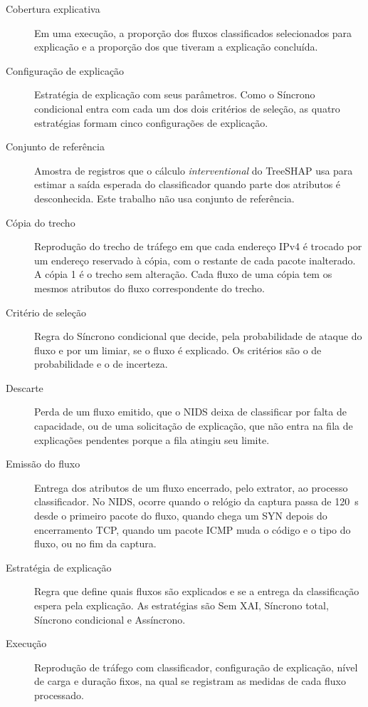 \documentclass[
  12pt,
  oneside,
  a4paper,
  chapter=TITLE,
  sumario=tradicional,
  english,
  brazil
]{abntex2}
\begin{document}
\begin{description}
  \item[Cobertura explicativa]\label{gl:cobertura-explicativa} Em uma execução, a proporção dos fluxos classificados selecionados para explicação e a proporção dos que tiveram a explicação concluída.
  \item[Configuração de explicação]\label{gl:configuracao} Estratégia de explicação com seus parâmetros. Como o Síncrono condicional entra com cada um dos dois critérios de seleção, as quatro estratégias formam cinco configurações de explicação.
  \item[Conjunto de referência]\label{gl:conjunto-referencia} Amostra de registros que o cálculo \emph{interventional} do TreeSHAP usa para estimar a saída esperada do classificador quando parte dos atributos é desconhecida. Este trabalho não usa conjunto de referência.
  \item[Cópia do trecho]\label{gl:copia} Reprodução do trecho de tráfego em que cada endereço IPv4 é trocado por um endereço reservado à cópia, com o restante de cada pacote inalterado. A cópia 1 é o trecho sem alteração. Cada fluxo de uma cópia tem os mesmos atributos do fluxo correspondente do trecho.
  \item[Critério de seleção]\label{gl:criterio-selecao} Regra do Síncrono condicional que decide, pela probabilidade de ataque do fluxo e por um limiar, se o fluxo é explicado. Os critérios são o de probabilidade e o de incerteza.
  \item[Descarte]\label{gl:descarte} Perda de um fluxo emitido, que o NIDS deixa de classificar por falta de capacidade, ou de uma solicitação de explicação, que não entra na fila de explicações pendentes porque a fila atingiu seu limite.
  \item[Emissão do fluxo]\label{gl:emissao} Entrega dos atributos de um fluxo encerrado, pelo extrator, ao processo classificador. No NIDS, ocorre quando o relógio da captura passa de 120~s desde o primeiro pacote do fluxo, quando chega um SYN depois do encerramento TCP, quando um pacote ICMP muda o código e o tipo do fluxo, ou no fim da captura.
  \item[Estratégia de explicação]\label{gl:estrategia} Regra que define quais fluxos são explicados e se a entrega da classificação espera pela explicação. As estratégias são Sem XAI, Síncrono total, Síncrono condicional e Assíncrono.
  \item[Execução]\label{gl:execucao} Reprodução de tráfego com classificador, configuração de explicação, nível de carga e duração fixos, na qual se registram as medidas de cada fluxo processado.

\end{description}
\end{document}
